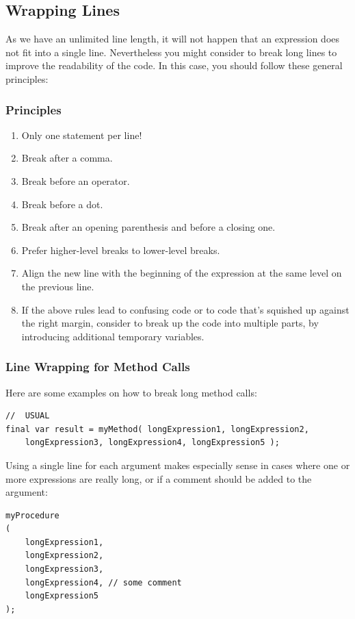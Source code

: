 \subsection{Wrapping Lines}\label{sec:WrappingLines}
As we have an unlimited line length, it will not happen that an expression does not fit into a single line. Nevertheless you might consider to break long lines to improve the readability of the code. In this case, you should follow these general principles:

\subsubsection{Principles}
\begin{enumerate}[label=P\arabic*.]
\item{Only one statement per line!}
\item{Break after a comma.}
\item{Break before an operator.}
\item{Break before a dot.}
\item{Break after an opening parenthesis and before a closing one.}
\item{Prefer higher-level breaks to lower-level breaks.}
\item{Align the new line with the beginning of the expression at the same level on the previous line.}
\item{If the above rules lead to confusing code or to code that's squished up against the right margin, consider to break up the code into multiple parts, by introducing additional temporary variables.}
\end{enumerate}

\subsubsection*{Line Wrapping for Method Calls}
Here are some examples on how to break long method calls:
\begin{lstlisting}
//  USUAL
final var result = myMethod( longExpression1, longExpression2, 
    longExpression3, longExpression4, longExpression5 );
\end{lstlisting}
Using a single line for each argument makes especially sense in cases where one or more expressions are really long, or if a comment should be added to the argument:
\begin{lstlisting}
myProcedure
( 
    longExpression1,
    longExpression2,
    longExpression3,
    longExpression4, // some comment
    longExpression5
);
\end{lstlisting}

